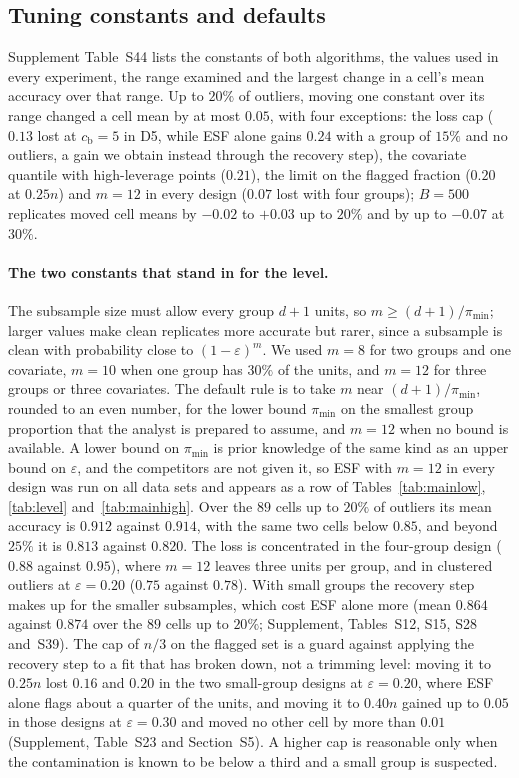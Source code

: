 \subsection{Tuning constants and defaults}
\label{sec:constants}

Supplement Table~S44 lists the constants of both algorithms, the values used in every
experiment, the range examined and the largest change in a cell's mean accuracy over that
range. Up to $20\%$ of outliers, moving one constant over its range changed a cell mean by at
most $0.05$, with four exceptions: the loss cap ($0.13$ lost at $c_{\mathrm b}=5$ in D5, while ESF
alone gains $0.24$ with a group of $15\%$ and no outliers, a gain we obtain instead through the
recovery step), the covariate quantile with high-leverage points ($0.21$), the limit on the
flagged fraction ($0.20$ at $0.25n$) and $m=12$ in every design ($0.07$ lost with four groups); $B=500$ replicates moved cell means by $-0.02$ to $+0.03$ up to $20\%$ and
by up to $-0.07$ at $30\%$.


\paragraph{The two constants that stand in for the level.} The subsample size must allow every
group $d+1$ units, so $m\ge(d+1)/\pi_{\min}$; larger values make clean replicates more accurate
but rarer, since a subsample is clean with probability close to $(1-\varepsilon)^{m}$. We used
$m=8$ for two groups and one covariate, $m=10$ when one group has $30\%$ of the units, and
$m=12$ for three groups or three covariates. The default rule is to take $m$ near
$(d+1)/\pi_{\min}$, rounded to an even number, for the lower bound $\pi_{\min}$ on the smallest
group proportion that the analyst is prepared to assume, and $m=12$ when no bound is
available. A lower bound on $\pi_{\min}$ is prior knowledge of the same kind as an upper bound
on $\varepsilon$, and the competitors are not given it, so ESF with $m=12$ in every design was
run on all data sets and appears as a row of Tables~\ref{tab:mainlow}, \ref{tab:level}
and~\ref{tab:mainhigh}. Over the $89$ cells up to $20\%$ of outliers its mean accuracy is
$0.912$ against $0.914$, with the same two cells below $0.85$, and beyond $25\%$ it is $0.813$
against $0.820$. The loss is concentrated in the four-group design ($0.88$ against $0.95$), where
$m=12$ leaves three units per group, and in clustered outliers at $\varepsilon=0.20$ ($0.75$
against $0.78$). With small groups the recovery step makes up for the smaller subsamples, which cost ESF alone
more (mean $0.864$ against $0.874$ over the $89$ cells up to $20\%$; Supplement, Tables~S12, S15, S28 and~S39). The cap of $n/3$ on the
flagged set is a guard against applying the recovery step to a fit that has broken down, not
a trimming level: moving it to $0.25n$ lost $0.16$ and $0.20$ in the two small-group designs
at $\varepsilon=0.20$, where ESF alone flags about a quarter of the units, and moving it to
$0.40n$ gained up to $0.05$ in those designs at $\varepsilon=0.30$ and moved no other cell by
more than $0.01$ (Supplement, Table~S23 and Section~S5). A higher cap is reasonable only when the
contamination is known to be below a third and a small group is suspected.

